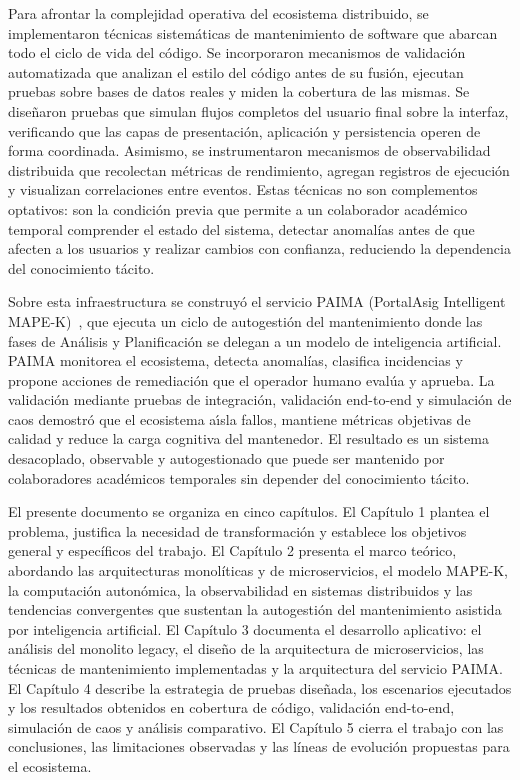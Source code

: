 Para afrontar la complejidad operativa del ecosistema distribuido, se
implementaron t\'{e}cnicas sistem\'{a}ticas de mantenimiento de software que abarcan
todo el ciclo de vida del c\'{o}digo. Se incorporaron mecanismos de validaci\'{o}n
automatizada que analizan el estilo del c\'{o}digo antes de su fusi\'{o}n, ejecutan
pruebas sobre bases de datos reales y miden la cobertura de las mismas. Se
dise\~{n}aron pruebas que simulan flujos completos del usuario final sobre la
interfaz, verificando que las capas de presentaci\'{o}n, aplicaci\'{o}n y persistencia
operen de forma coordinada. Asimismo, se instrumentaron mecanismos de
observabilidad distribuida que recolectan m\'{e}tricas de rendimiento, agregan
registros de ejecuci\'{o}n y visualizan correlaciones entre eventos. Estas
t\'{e}cnicas no son complementos optativos: son la condici\'{o}n previa que permite a
un colaborador acad\'{e}mico temporal comprender el estado del sistema, detectar
anomal\'{i}as antes de que afecten a los usuarios y realizar cambios con confianza,
reduciendo la dependencia del conocimiento t\'{a}cito.

Sobre esta infraestructura se construy\'{o} el servicio PAIMA (PortalAsig
Intelligent MAPE-K)~\cite{esposito2025mapek}, que ejecuta un ciclo de autogesti\'{o}n del mantenimiento donde
las fases de An\'{a}lisis y Planificaci\'{o}n se delegan a un modelo de inteligencia
artificial. PAIMA monitorea el ecosistema, detecta anomal\'{i}as, clasifica
incidencias y propone acciones de remediaci\'{o}n que el operador humano eval\'{u}a y
aprueba. La validaci\'{o}n mediante pruebas de integraci\'{o}n, validaci\'{o}n end-to-end y
simulaci\'{o}n de caos demostr\'{o} que el ecosistema a\'{\i}sla fallos, mantiene m\'{e}tricas
objetivas de calidad y reduce la carga cognitiva del mantenedor. El resultado es
un sistema desacoplado, observable y autogestionado que puede ser mantenido por
colaboradores acad\'{e}micos temporales sin depender del conocimiento t\'{a}cito.

El presente documento se organiza en cinco cap\'{i}tulos. El Cap\'{i}tulo 1 plantea el
problema, justifica la necesidad de transformaci\'{o}n y establece los objetivos
general y espec\'{i}ficos del trabajo. El Cap\'{i}tulo 2 presenta el marco te\'{o}rico,
abordando las arquitecturas monol\'{i}ticas y de microservicios, el modelo MAPE-K, la
computaci\'{o}n auton\'{o}mica, la observabilidad en sistemas distribuidos y las
tendencias convergentes que sustentan la autogesti\'{o}n del mantenimiento asistida
por inteligencia artificial. El Cap\'{i}tulo 3 documenta el desarrollo aplicativo:
el an\'{a}lisis del monolito legacy, el dise\~{n}o de la arquitectura de
microservicios, las t\'{e}cnicas de mantenimiento implementadas y la arquitectura
del servicio PAIMA. El Cap\'{i}tulo 4 describe la estrategia de pruebas dise\~{n}ada,
los escenarios ejecutados y los resultados obtenidos en cobertura de c\'{o}digo,
validaci\'{o}n end-to-end, simulaci\'{o}n de caos y an\'{a}lisis comparativo. El
Cap\'{i}tulo 5 cierra el trabajo con las conclusiones, las limitaciones observadas
y las l\'{i}neas de evoluci\'{o}n propuestas para el ecosistema.
